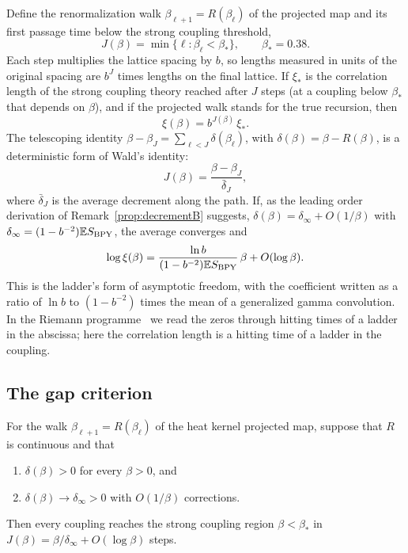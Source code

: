 Define the renormalization walk $\beta_{\ell+1}=R(\beta_\ell)$ of the projected map and its first passage time below the strong coupling threshold,
\[
J(\beta)=\min\{\ell:\beta_\ell<\beta_*\},\qquad\beta_*=0.38 .
\]
Each step multiplies the lattice spacing by $b$, so lengths measured in units of the original spacing are $b^{J}$ times lengths on the final lattice. If $\xi_*$ is the correlation length of the strong coupling theory reached after $J$ steps (at a coupling below $\beta_*$ that depends on $\beta$), and if the projected walk stands for the true recursion, then
\[
\xi(\beta)=b^{J(\beta)}\,\xi_* .
\]
The telescoping identity $\beta-\beta_J=\sum_{\ell<J}\delta(\beta_\ell)$, with $\delta(\beta)=\beta-R(\beta)$, is a deterministic form of Wald's identity:
\[
J(\beta)=\frac{\beta-\beta_J}{\bar\delta_J},
\]
where $\bar\delta_J$ is the average decrement along the path. If, as the leading order derivation of Remark~\ref{prop:decrementB} suggests, $\delta(\beta)=\delta_\infty+O(1/\beta)$ with $\delta_\infty=(1-b^{-2})\mathbb{E} S_{\mathrm{BPY}}$, the average converges and
\[
\log\xi(\beta)=\frac{\ln b}{(1-b^{-2})\mathbb{E} S_{\mathrm{BPY}}}\,\beta+O(\log\beta).
\]
This is the ladder's form of asymptotic freedom, with the coefficient written as a ratio of $\ln b$ to $(1-b^{-2})$ times the mean of a generalized gamma convolution. In the Riemann programme~\cite{PS26a} we read the zeros through hitting times of a ladder in the abscissa; here the correlation length is a hitting time of a ladder in the coupling.

\subsection{The gap criterion}

\begin{proposition}\label{prop:criterionB}
For the walk $\beta_{\ell+1}=R(\beta_\ell)$ of the heat kernel projected map, suppose that $R$ is continuous and that
\begin{enumerate}
\item[(A)] $\delta(\beta)>0$ for every $\beta>0$, and
\item[(B)] $\delta(\beta)\to\delta_\infty>0$ with $O(1/\beta)$ corrections.
\end{enumerate}
Then every coupling reaches the strong coupling region $\beta<\beta_*$ in $J(\beta)=\beta/\delta_\infty+O(\log\beta)$ steps.
\end{proposition}

